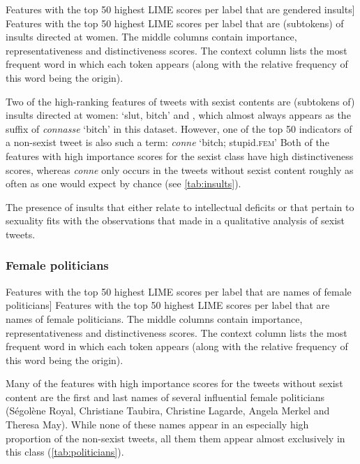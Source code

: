 \begin{table}[htbp]
    
    \caption
    [Features with the top 50 highest LIME scores per label that are gendered insults]
    {Features with the top 50 highest LIME scores per label that are (subtokens) of insults directed at women.
    The middle columns contain importance, representativeness and distinctiveness scores.
    The context column lists the most frequent word in which each token appears (along with the relative frequency of this word being the origin).
    }
    \label{tab:insults}
\end{table}


Two of the high-ranking features of tweets with sexist contents are (subtokens of) insults directed at women:  `slut, bitch' and , which almost always appears as the suffix of \textit{connasse} `bitch' in this dataset.
However, one of the top 50 indicators of a non-sexist tweet is also such a term: \textit{conne} `bitch; stupid.\textsc{fem}'
Both of the features with high importance scores for the sexist class have high distinctiveness scores, whereas \textit{conne} only occurs in the tweets without sexist content roughly as often as one would expect by chance (see \autoref{tab:insults}).

The presence of insults that either relate to intellectual deficits or that pertain to sexuality fits with the observations that \citet{dupre2020violences} made in a qualitative analysis of sexist tweets.

\subsubsection{Female politicians}

\begin{table}[htbp]
    
    \caption
    [Features with the top 50 highest LIME scores per label that are names of female politicians]
    {Features with the top 50 highest LIME scores per label that are names of female politicians.
    The middle columns contain importance, representativeness and distinctiveness scores.
    The context column lists the most frequent word in which each token appears (along with the relative frequency of this word being the origin).
    }
    \label{tab:politicians}
\end{table}

Many of the features with high importance scores for the tweets without sexist content are the first and last names of several influential female politicians (Ségolène Royal, Christiane Taubira, Christine Lagarde, Angela Merkel and Theresa May).
While none of these names appear in an especially high proportion of the non-sexist tweets, all them them appear almost exclusively in this class (\autoref{tab:politicians}).


